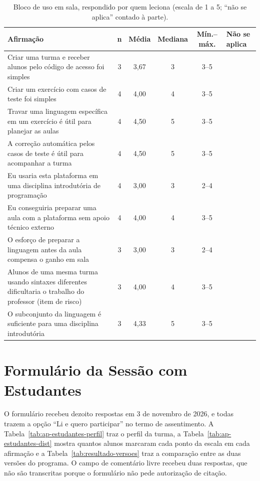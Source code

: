 \begin{table}[htbp]
\centering
\caption{Bloco de uso em sala, respondido por quem leciona (escala de 1 a 5; ``não se aplica'' contado à parte).}
\label{tab:ap-ava}
\footnotesize
\renewcommand{\arraystretch}{1.2}
\begin{tabular}{|p{7.8cm}|c|c|c|c|p{1.4cm}|}
\hline
\textbf{Afirmação} & \textbf{n} & \textbf{Média} & \textbf{Mediana} & \textbf{Mín.--máx.} & \textbf{Não se aplica} \\\hline
Criar uma turma e receber alunos pelo código de acesso foi simples & 3 & 3,67 & 3 & 3--5 & \centering\arraybackslash 1 \\\hline
Criar um exercício com casos de teste foi simples & 4 & 4,00 & 4 & 3--5 & \centering\arraybackslash 0 \\\hline
Travar uma linguagem específica em um exercício é útil para planejar as aulas & 4 & 4,50 & 5 & 3--5 & \centering\arraybackslash 0 \\\hline
A correção automática pelos casos de teste é útil para acompanhar a turma & 4 & 4,50 & 5 & 3--5 & \centering\arraybackslash 0 \\\hline
Eu usaria esta plataforma em uma disciplina introdutória de programação & 4 & 3,00 & 3 & 2--4 & \centering\arraybackslash 0 \\\hline
Eu conseguiria preparar uma aula com a plataforma sem apoio técnico externo & 4 & 4,00 & 4 & 3--5 & \centering\arraybackslash 0 \\\hline
O esforço de preparar a linguagem antes da aula compensa o ganho em sala & 3 & 3,00 & 3 & 2--4 & \centering\arraybackslash 1 \\\hline
Alunos de uma mesma turma usando sintaxes diferentes dificultaria o trabalho do professor (item de risco) & 3 & 4,00 & 4 & 3--5 & \centering\arraybackslash 1 \\\hline
O subconjunto da linguagem é suficiente para uma disciplina introdutória & 3 & 4,33 & 5 & 3--5 & \centering\arraybackslash 1 \\\hline
\end{tabular}
\end{table}

\section{Formulário da Sessão com Estudantes}

O formulário recebeu dezoito respostas em 3 de novembro de 2026, e todas trazem a opção ``Li e quero participar'' no termo de assentimento. A Tabela~\ref{tab:ap-estudantes-perfil} traz o perfil da turma, a Tabela~\ref{tab:ap-estudantes-dist} mostra quantos alunos marcaram cada ponto da escala em cada afirmação e a Tabela~\ref{tab:resultado-versoes} traz a comparação entre as duas versões do programa. O campo de comentário livre recebeu duas respostas, que não são transcritas porque o formulário não pede autorização de citação.

